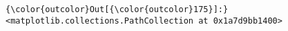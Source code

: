 \documentclass[11pt]{article}
\begin{document}
\begin{Verbatim}[commandchars=\\\{\}]
{\color{outcolor}Out[{\color{outcolor}175}]:} <matplotlib.collections.PathCollection at 0x1a7d9bb1400>
\end{Verbatim}
            
    \begin{center}
    \end{center}
    { \hspace*{\fill} \\}
    

    
    
    
    
\end{document}
